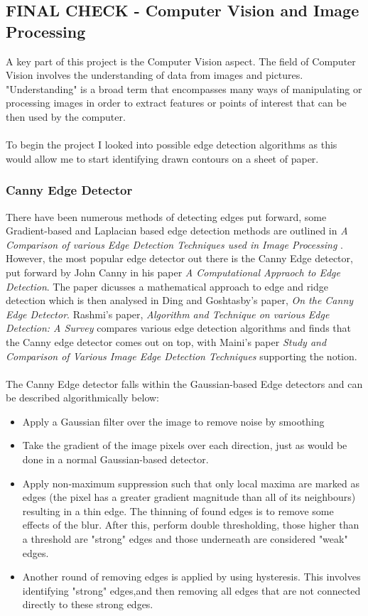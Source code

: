 \documentclass[11pt]{article}
\begin{document}
\subsection{FINAL CHECK - Computer Vision and Image Processing}
A key part of this project is the Computer Vision aspect. The field of
Computer Vision involves the understanding of data from images and pictures.
"Understanding" is a broad term that encompasses many ways of manipulating or
processing images in order to extract features or points of interest that
can be then used by the computer. \\
\\
To begin the project I looked into possible edge detection algorithms as 
this would allow me to start identifying drawn contours on a sheet of paper.

\subsubsection{Canny Edge Detector}
\label{sec:Canny}
There have been numerous methods of detecting edges put forward,
some Gradient-based and Laplacian based edge detection methods are 
outlined in 
\textit{A Comparison of various Edge Detection Techniques used in Image Processing}
\cite{Shriv12}. However, the most popular edge detector out there is the
Canny Edge detector, put forward by John Canny in his paper
\textit{A Computational Appraoch to Edge Detection}\cite{Canny86}. The paper
dicusses a mathematical approach to edge and ridge detection which is then
analysed in Ding and Goshtasby's paper, 
\textit{On the Canny Edge Detector}\cite{Ding00}. Rashmi's paper,
\textit{Algorithm and Technique on various Edge Detection: A Survey}
\cite{Rashmi13} compares various edge detection algorithms and finds that 
the Canny edge detector comes out on top, with Maini's paper 
\textit{Study and Comparison of Various Image Edge Detection Techniques} 
\cite{Maini} supporting the notion.\\
\\
The Canny Edge detector falls within the Gaussian-based Edge detectors and
can be described algorithmically below:
\begin{itemize}
	\item Apply a Gaussian filter over the image to remove noise by smoothing
	\item Take the gradient of the image pixels over each direction, just as
		  would be done in a normal Gaussian-based detector.
	\item Apply non-maximum suppression 
		  such that only local maxima are marked as edges (the pixel 
		  has a greater gradient magnitude than all
		  of its neighbours) resulting in a thin edge. The thinning of found
		  edges is to remove some effects of the blur. After this, perform
		  double thresholding, those higher than a threshold are "strong" edges
		  and those underneath are considered "weak" edges.
	\item Another round of removing edges is applied by using hysteresis.
		  This involves identifying "strong" edges,and then removing 
		  all edges that are not connected directly to these strong edges.
\end{itemize}
\end{document}
